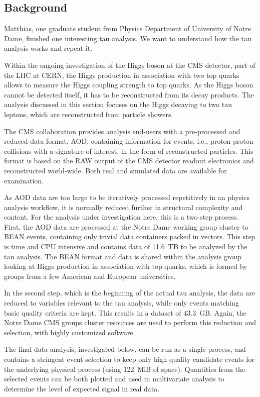 \documentclass{acm_proc_article-sp}
\begin{document}
\subsection{Background}
Matthias, one graduate student from Physics Department of University of Notre Dame, finished one interesting tau analysis. We want to understand how the tau analysis works and repeat it. 

Within the ongoing investigation of the Higgs boson at the CMS
detector, part of the LHC at CERN, the Higgs production in association
with two top quarks allows to measure the Higgs coupling strength to
top quarks.  As the Higgs boson cannot be detected itself, it has to
be reconstructed from its decay products.  The analysis discussed in
this section focuses on the Higgs decaying to two tau leptons, which
are reconstructed from particle showers.

The CMS collaboration provides analysis end-users with a pre-processed
and reduced data format, AOD, containing information for events, i.e.,
proton-proton collisions with a signature of interest, in the form of
reconstructed particles.  This format is based on the RAW output of
the CMS detector readout electronics and reconstructed world-wide.
Both real and simulated data are available for examination.

As AOD data are too large to be iteratively processed repetitively in
an physics analysis workflow, it is normally reduced further in
structural complexity and content.  For the analysis under
investigation here, this is a two-step process.  First, the AOD data
are processed at the Notre Dame working group cluster to BEAN events,
containing only trivial data containers packed in vectors.  This step
is time and CPU intensive and contains data of \SI{11.6}{TB} to be
analyzed by the tau analysis.  The BEAN format and data is shared
within the analysis group looking at Higgs production in association
with top quarks, which is formed by groups from a few American and
European universities.

In the second step, which is the beginning of the actual tau analysis,
the data are reduced to variables relevant to the tau analysis, while
only events matching basic quality criteria are kept.  This results in
a dataset of \SI{43.3}{GB}.  Again, the Notre Dame CMS groups cluster
resources are used to perform this reduction and selection, with
highly customized software.

The final data analysis, investigated below, can be run as a single
process, and contains a stringent event selection to keep only high
quality candidate events for the underlying physical process (using
\SI{122}{MiB} of space).  Quantities from the selected events can be
both plotted and used in multivariate analysis to determine the level
of expected signal in real data.
\end{document}

